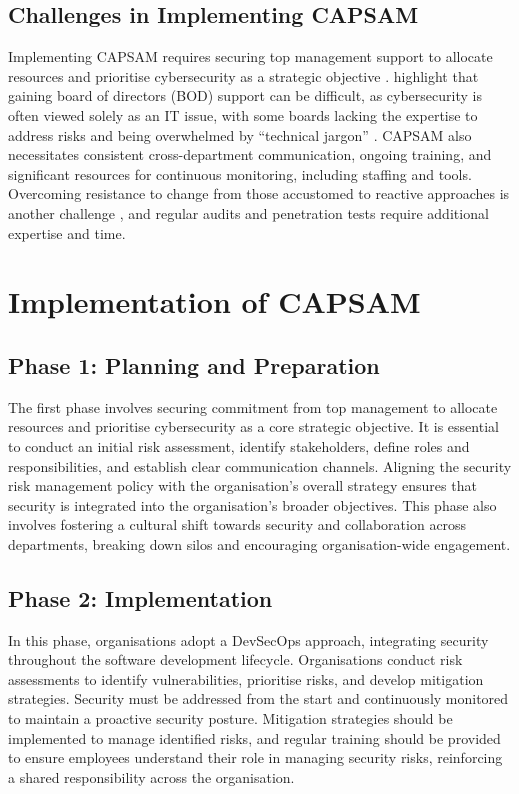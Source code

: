     \subsection{Challenges in Implementing CAPSAM}
    Implementing CAPSAM requires securing top management support to allocate resources and prioritise cybersecurity as a strategic objective \citep{shedden2010information}. \citet{fazlida2015information} highlight that gaining board of directors (BOD) support can be difficult, as cybersecurity is often viewed solely as an IT issue, with some boards lacking the expertise to address risks and being overwhelmed by ``technical jargon'' \citep{hartmann2021academic}. CAPSAM also necessitates consistent cross-department communication, ongoing training, and significant resources for continuous monitoring, including staffing and tools. Overcoming resistance to change from those accustomed to reactive approaches is another challenge \citep{murray2003continuous}, and regular audits and penetration tests require additional expertise and time.

\section{Implementation of CAPSAM}
    \subsection{Phase 1: Planning and Preparation}
    The first phase involves securing commitment from top management to allocate resources and prioritise cybersecurity as a core strategic objective. It is essential to conduct an initial risk assessment, identify stakeholders, define roles and responsibilities, and establish clear communication channels. Aligning the security risk management policy with the organisation's overall strategy ensures that security is integrated into the organisation's broader objectives. This phase also involves fostering a cultural shift towards security and collaboration across departments, breaking down silos and encouraging organisation-wide engagement.

    \subsection{Phase 2: Implementation}
    In this phase, organisations adopt a DevSecOps approach, integrating security throughout the software development lifecycle. Organisations conduct risk assessments to identify vulnerabilities, prioritise risks, and develop mitigation strategies. Security must be addressed from the start and continuously monitored to maintain a proactive security posture. Mitigation strategies should be implemented to manage identified risks, and regular training should be provided to ensure employees understand their role in managing security risks, reinforcing a shared responsibility across the organisation.

